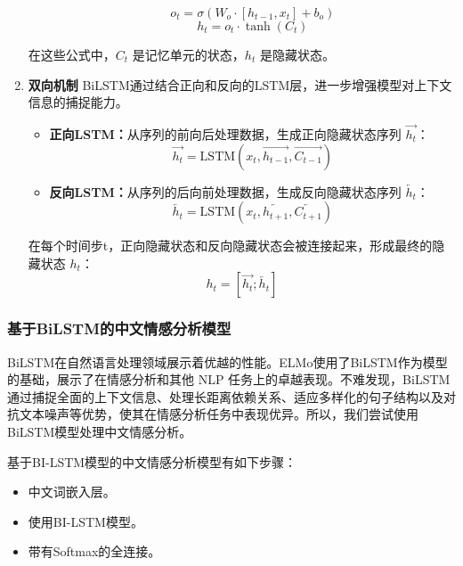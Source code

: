 \begin{enumerate}
\begin{itemize}
\begin{equation}
            o_t = \sigma(W_o \cdot [h_{t-1}, x_t] + b_o)
        \end{equation}
        \begin{equation}
            h_t = o_t \cdot \tanh(C_t)
        \end{equation}
    \end{itemize}
    在这些公式中，$C_t$ 是记忆单元的状态，$h_t$ 是隐藏状态。
    \item \textbf{双向机制}\newline
    BiLSTM通过结合正向和反向的LSTM层，进一步增强模型对上下文信息的捕捉能力。
    \begin{itemize}
        \item \textbf{正向LSTM：}从序列的前向后处理数据，生成正向隐藏状态序列 $\overrightarrow{h_t}$：
        \begin{equation}
            \overrightarrow{h_t} = \text{LSTM}(x_t, \overrightarrow{h_{t-1}}, \overrightarrow{C_{t-1}})
        \end{equation}
        \item \textbf{反向LSTM：}从序列的后向前处理数据，生成反向隐藏状态序列 $\overleftarrow{h_t}$：
        \begin{equation}
            \overleftarrow{h_t} = \text{LSTM}(x_t, \overleftarrow{h_{t+1}}, \overleftarrow{C_{t+1}})
        \end{equation}
    \end{itemize}
    在每个时间步t，正向隐藏状态和反向隐藏状态会被连接起来，形成最终的隐藏状态 $h_t$：
    \begin{equation}
        h_t = [\overrightarrow{h_t}; \overleftarrow{h_t}]
    \end{equation}

\end{enumerate}
\subsubsection{基于BiLSTM的中文情感分析模型}

BiLSTM在自然语言处理领域展示着优越的性能\cite{huang2015bidirectional}。ELMo\cite{sarzynska2021detecting}使用了BiLSTM作为模型的基础，展示了在情感分析和其他 NLP 任务上的卓越表现。不难发现，BiLSTM通过捕捉全面的上下文信息、处理长距离依赖关系、适应多样化的句子结构以及对抗文本噪声等优势，使其在情感分析任务中表现优异。所以，我们尝试使用BiLSTM模型处理中文情感分析。

基于BI-LSTM模型的中文情感分析模型有如下步骤：

\begin{itemize}[noitemsep, topsep=1pt, partopsep=1pt, parsep=1pt, left=32pt]
    \item 中文词嵌入层。
    \item 使用BI-LSTM模型。
    \item 带有Softmax的全连接。
\end{itemize}

